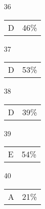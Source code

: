 \documentclass[12pt]{article}
\begin{document}
\begin{multicols}{5}
\begin{enumerate}
\item[]
\item[36] \begin{tabular}{cc} D & 46\%\end{tabular}
\item[37] \begin{tabular}{cc} D & 53\%\end{tabular}
\item[38] \begin{tabular}{cc} D & 39\%\end{tabular}
\item[39] \begin{tabular}{cc} E & 54\%\end{tabular}
\item[40] \begin{tabular}{cc} A & 21\%\end{tabular}

\item[]


\end{enumerate}
\end{multicols}
\end{document}
